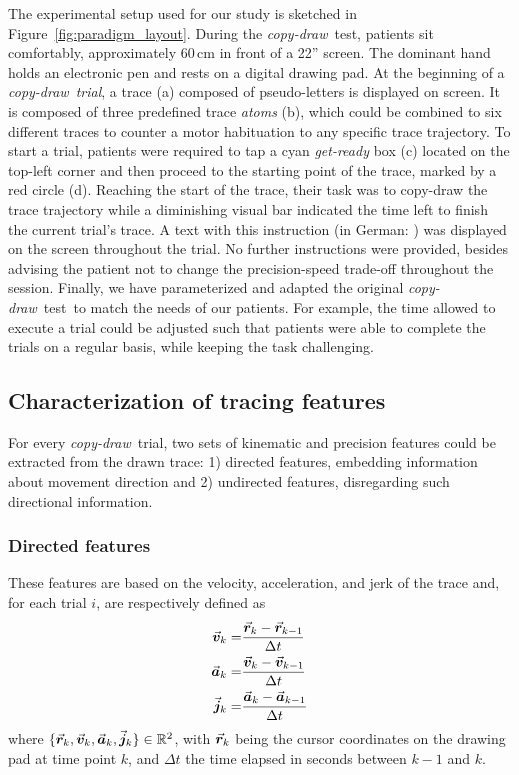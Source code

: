 \documentclass[10pt,a4paper, twocolumn]{article}
\newcommand{\cpd}[0]{\textit{copy-draw}\xspace}
\newcommand{\cpdt}[0]{\textit{copy-draw}~test\xspace}
\newcommand{\tracepos}{\vec{\ve{r}}}
\newcommand{\speeddir}{\vec{\ve{v}}}
\newcommand{\jerkdir}{\vec{\ve{j}}}
\newcommand{\acceldir}{\vec{\ve{a}}}
\begin{document}
The experimental setup used for our study is sketched in Figure~\ref{fig:paradigm_layout}. During the \cpdt, patients sit comfortably, approximately 60\,cm in front of a 22'' screen. The dominant hand holds an electronic pen and rests on a digital drawing pad. At the beginning of a \cpd~\textit{trial}, a trace (a) composed of pseudo-letters is displayed on screen. It is composed of three predefined trace \textit{atoms} (b), which could be combined to six different traces to counter a motor habituation to any specific trace trajectory. 
To start a trial, patients were required to tap a cyan \textit{get-ready} box (c) located on the top-left corner and then proceed to the starting point of the trace, marked by a red circle (d). Reaching the start of the trace, their task was to copy-draw the trace trajectory  while a diminishing visual bar indicated the time left to finish the current trial's trace. A text with this instruction (in German: ) was displayed on the screen throughout the trial. No further instructions were provided, besides advising the patient not to change the precision-speed trade-off throughout the session.  Finally, we have parameterized and adapted the original \cpdt~to match the needs of our patients. For example, the time allowed to execute a trial could be adjusted such that patients were able to complete the trials on a regular basis, while keeping the task challenging.
\subsection{Characterization of tracing features}
For every \cpd~trial, two sets of kinematic and precision features could be extracted from the drawn trace: 1) directed features, embedding information about movement direction and 2) undirected features, disregarding such directional information.

\subsubsection{Directed features}  These features are based on the velocity, acceleration, and jerk of the trace and, for each trial $i$, are respectively defined as
\begin{align*}
\speeddir_k =& \frac{\tracepos_k - \tracepos_{k-1}}{\Delta t} \\
\acceldir_k =& \frac{\speeddir_k -\speeddir_{k-1}}{\Delta t}\\
\jerkdir_k =& \frac{\acceldir_k-\acceldir_{k-1}}{\Delta t}
\end{align*}
where $\lbrace \tracepos_k, \speeddir_k, \acceldir_k, \jerkdir_k \rbrace \in \Real^{2}$, with $\tracepos_k$ being the cursor coordinates on the drawing pad at time point $k$, and $\Delta t$ the time elapsed in seconds between $k-1$ and $k$.
\end{document}
